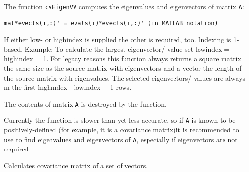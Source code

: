 The function \texttt{cvEigenVV} computes the eigenvalues and eigenvectors of matrix \texttt{A}:

\begin{lstlisting}
mat*evects(i,:)' = evals(i)*evects(i,:)' (in MATLAB notation)
\end{lstlisting}

If either low- or highindex is supplied the other is required, too.
Indexing is 1-based. Example: To calculate the largest eigenvector/-value set
lowindex = highindex = 1.
For legacy reasons this function always returns a square matrix the same size
as the source matrix with eigenvectors and a vector the length of the source
matrix with eigenvalues. The selected eigenvectors/-values are always in the
first highindex - lowindex + 1 rows.

The contents of matrix \texttt{A} is destroyed by the function.

Currently the function is slower than  yet less accurate,
so if \texttt{A} is known to be positively-defined (for example, it
is a covariance matrix)it is recommended to use  to find
eigenvalues and eigenvectors of \texttt{A}, especially if eigenvectors
are not required.

\label{CalcCovarMatrix}

Calculates covariance matrix of a set of vectors.


